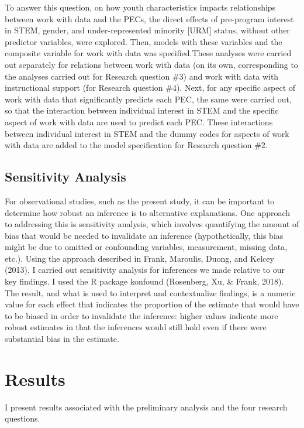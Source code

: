 \documentclass[]{msu-thesis}
\theoremstyle{definition}
\theoremstyle{definition}
\theoremstyle{definition}
\theoremstyle{remark}
\begin{document}
To answer this question, on how youth characteristics impacts
relationships between work with data and the PECs, the direct effects of
pre-program interest in STEM, gender, and under-represented minority
{[}URM{]} status, without other predictor variables, were explored.
Then, models with these variables and the composite variable for work
with data was specified.These analyses were carried out separately for
relations between work with data (on its own, corresponding to the
analyses carried out for Research question \#3) and work with data with
instructional support (for Research question \#4). Next, for any
specific aspect of work with data that significantly predicts each PEC,
the same were carried out, so that the interaction between individual
interest in STEM and the specific aspect of work with data are used to
predict each PEC. These interactions between individual interest in STEM
and the dummy codes for aspects of work with data are added to the model
specification for Research question \#2.

\section{Sensitivity Analysis}\label{sensitivity-analysis}

For observational studies, such as the present study, it can be
important to determine how robust an inference is to alternative
explanations. One approach to addressing this is sensitivity analysis,
which involves quantifying the amount of bias that would be needed to
invalidate an inference (hypothetically, this bias might be due to
omitted or confounding variables, measurement, missing data, etc.).
Using the approach described in Frank, Maroulis, Duong, and Kelcey
(2013), I carried out sensitivity analysis for inferences we made
relative to our key findings. I used the R package konfound (Rosenberg,
Xu, \& Frank, 2018). The result, and what is used to interpret and
contextualize findings, is a numeric value for each effect that
indicates the proportion of the estimate that would have to be biased in
order to invalidate the inference: higher values indicate more robust
estimates in that the inferences would still hold even if there were
substantial bias in the estimate.

\chapter{Results}\label{results}

I present results associated with the preliminary analysis and the four
research questions.
\end{document}
